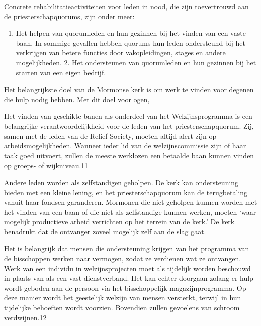 \documentclass[
  a5paper,
  smalldemyvopaper,10pt,twoside,onecolumn,openright,extrafontsizes,hidelinks]{memoir}
\providecommand{\tightlist}{%
  \setlength{\itemsep}{0pt}\setlength{\parskip}{0pt}}\usepackage{longtable,booktabs,array}
\renewenvironment{quote}%
               {\list{}{\rightmargin=.6cm\leftmargin=.6cm}%
                \itshape \item[]}%
               {\endlist}
\begin{document}
Concrete rehabilitatieactiviteiten voor leden in nood, die zijn
toevertrouwd aan de priesterschapquorums, zijn onder meer:

\begin{quote}
\begin{enumerate}
\def\labelenumi{\arabic{enumi}.}
\tightlist
\item
  Het helpen van quorumleden en hun gezinnen bij het vinden van een
  vaste baan. In sommige gevallen hebben quorums hun leden ondersteund
  bij het verkrijgen van betere functies door vakopleidingen, stages en
  andere mogelijkheden. 2. Het ondersteunen van quorumleden en hun
  gezinnen bij het starten van een eigen bedrijf.
\end{enumerate}
\end{quote}

Het belangrijkste doel van de Mormonse kerk is om werk te vinden voor
degenen die hulp nodig hebben. Met dit doel voor ogen,

\begin{quote}
Het vinden van geschikte banen als onderdeel van het Welzijnsprogramma
is een belangrijke verantwoordelijkheid voor de leden van het
priesterschapquorum. Zij, samen met de leden van de Relief Society,
moeten altijd alert zijn op arbeidsmogelijkheden. Wanneer ieder lid van
de welzijnscommissie zijn of haar taak goed uitvoert, zullen de meeste
werklozen een betaalde baan kunnen vinden op groeps- of wijkniveau.11
\end{quote}

Andere leden worden als zelfstandigen geholpen. De kerk kan
ondersteuning bieden met een kleine lening, en het priesterschapquorum
kan de terugbetaling vanuit haar fondsen garanderen. Mormonen die niet
geholpen kunnen worden met het vinden van een baan of die niet als
zelfstandige kunnen werken, moeten `waar mogelijk productieve arbeid
verrichten op het terrein van de kerk.' De kerk benadrukt dat de
ontvanger zoveel mogelijk zelf aan de slag gaat.

\begin{quote}
Het is belangrijk dat mensen die ondersteuning krijgen van het programma
van de bisschoppen werken naar vermogen, zodat ze verdienen wat ze
ontvangen. Werk van een individu in welzijnsprojecten moet als tijdelijk
worden beschouwd in plaats van als een vast dienstverband. Het kan
echter doorgaan zolang er hulp wordt geboden aan de persoon via het
bisschoppelijk magazijnprogramma. Op deze manier wordt het geestelijk
welzijn van mensen versterkt, terwijl in hun tijdelijke behoeften wordt
voorzien. Bovendien zullen gevoelens van schroom verdwijnen.12
\end{quote}
\end{document}
